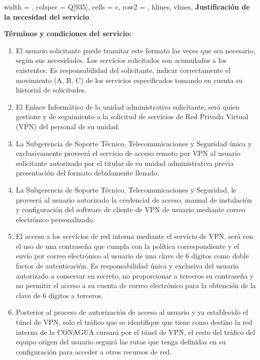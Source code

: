 \documentclass[letterpaper,11pt]{article}
\begin{document}
\vspace{-15pt}
\begin{longtblr}[
	label = none,
	entry = none,
	]{
		width = \linewidth,
		colspec = {Q[935]},
		cells = {c},
		row{2} = {},
		hlines,
		vlines,
	}
	\textbf{Justificación de la necesidad del servicio} \\\JUSTIFICACION
\end{longtblr}
\clearpage
\textbf{ \large Términos y condiciones del servicio:}
{  \footnotesize\begin{enumerate}
	\item El usuario solicitante puede tramitar este formato las veces que sea necesario, según sus necesidades. Los servicios solicitados son acumulados a los existentes. Es responsabilidad del solicitante, indicar correctamente el movimiento (A, B, C) de los servicios especificados tomando en cuenta su historial de solicitudes.
	\item El Enlace Informático de la unidad administrativa solicitante, será quien gestione y de seguimiento a la solicitud de servicios de Red Privada Virtual (VPN) del personal de su unidad. 
	\item La Subgerencia de Soporte Técnico, Telecomunicaciones y Seguridad única y exclusivamente proveerá el servicio de acceso remoto por VPN al usuario solicitante autorizado por el titular de su unidad administrativa previa presentación del formato debidamente llenado.
	\item La Subgerencia de Soporte Técnico, Telecomunicaciones y Seguridad, le proveerá al usuario autorizado la credencial de acceso, manual de instalación y configuración del software de cliente de VPN de usuario mediante correo electrónico personalizado.
	\item El acceso a los servicios de red interna mediante el servicio de VPN, será con el uso de una contraseña que cumpla con la política correspondiente y el envío por correo electrónico al usuario de una clave de 6 dígitos como doble factor de autenticación. Es responsabilidad única y exclusiva del usuario autorizado a conservar en secreto, no proporcionar a terceros su contraseña y no permitir el acceso a su cuenta de correo electrónico para la obtención de la clave de 6 dígitos a terceros.
	\item Posterior al proceso de autorización de acceso al usuario y ya establecido el túnel de VPN, solo el tráfico que se identifique que tiene como destino la red interna de la CONAGUA cursará por el túnel de VPN, el resto del tráfico del equipo origen del usuario seguirá las rutas que tenga definidas en su configuración para acceder a otros recursos de red.

\end{enumerate}}
\end{document}
